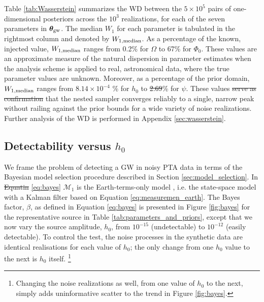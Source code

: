 \documentclass[fleqn,usenatbib,useAMS]{mnras}
\providecommand{\DIFadd}[1]{{\protect\color{blue}\uwave{#1}}} %
\providecommand{\DIFdel}[1]{{\protect\color{red}\sout{#1}}}                      %
\providecommand{\DIFaddbegin}{} %
\providecommand{\DIFaddend}{} %
\providecommand{\DIFdelbegin}{} %
\providecommand{\DIFdelend}{} %
\newcommand{\DIFscaledelfig}{0.5}
\newlength{\DIFdelgraphicswidth} %
\newlength{\DIFdelgraphicsheight} %
\newcommand{\DIFaddincludegraphics}[2][]{{\color{blue}\fbox{\DIFOincludegraphics[#1]{#2}}}} %
\newcommand{\DIFdelincludegraphics}[2][]{%
\sbox{\DIFdelgraphicsbox}{\DIFOincludegraphics[#1]{#2}}%
\settoboxwidth{\DIFdelgraphicswidth}{\DIFdelgraphicsbox} %
\settoboxtotalheight{\DIFdelgraphicsheight}{\DIFdelgraphicsbox} %
\scalebox{\DIFscaledelfig}{%
\parbox[b]{\DIFdelgraphicswidth}{\usebox{\DIFdelgraphicsbox}\\[-\baselineskip] \rule{\DIFdelgraphicswidth}{0em}}\llap{\resizebox{\DIFdelgraphicswidth}{\DIFdelgraphicsheight}{%
\setlength{\unitlength}{\DIFdelgraphicswidth}%
\begin{picture}(1,1)%
\thicklines\linethickness{2pt} %
{\color[rgb]{1,0,0}\put(0,0){\framebox(1,1){}}}%
{\color[rgb]{1,0,0}\put(0,0){\line( 1,1){1}}}%
{\color[rgb]{1,0,0}\put(0,1){\line(1,-1){1}}}%
\end{picture}%
}\hspace*{3pt}}} %
} %
\DeclareRobustCommand{\DIFaddbegin}{\DIFOaddbegin \let\includegraphics\DIFaddincludegraphics} %
\DeclareRobustCommand{\DIFaddend}{\DIFOaddend \let\includegraphics\DIFOincludegraphics} %
\DeclareRobustCommand{\DIFdelbegin}{\DIFOdelbegin \let\includegraphics\DIFdelincludegraphics} %
\DeclareRobustCommand{\DIFdelend}{\DIFOaddend \let\includegraphics\DIFOincludegraphics} %
\begin{document}
Table \ref{tab:Wasserstein} summarizes the WD between the $5\times 10^5$ pairs of one-dimensional posteriors across the $10^3$ realizations, for each of the seven parameters in ${\boldsymbol{\theta}}_{\rm gw}$. The median $W_1$ for each parameter is tabulated in the rightmost column and denoted by $W_{1,{\rm median}}$. As a percentage of the known, injected value, $W_{\rm 1,median}$ ranges from  0.2\% for $\Omega$ to 67\% for $\Phi_0$. These values are an approximate measure of the natural dispersion in parameter estimates when the analysis scheme is applied to real, astronomical data, where the true parameter values are unknown. Moreover, as a percentage of the prior domain, $W_{\rm 1,median}$ ranges from \DIFdelbegin \DIFdel{$8.14 \times 10^{-4}$ }\DIFdelend \DIFaddbegin \DIFadd{$8.1 \times 10^{-4}$ }\DIFaddend \% for $h_0$ to \DIFdelbegin \DIFdel{2.69}\DIFdelend \DIFaddbegin \DIFadd{2.7}\DIFaddend \% for $\psi$. These values \DIFdelbegin \DIFdel{serve as confirmation }\DIFdelend \DIFaddbegin \DIFadd{confirm }\DIFaddend that the nested sampler converges reliably to a single, narrow peak without railing against the prior bounds for a wide variety of noise realizations. Further analysis of the WD is performed in Appendix \ref{sec:wasserstein}.



\subsection{Detectability versus $h_0$} \label{sec:detection}
We frame the problem of detecting a GW in noisy PTA data in terms of the Bayesian model selection procedure described in Section \ref{sec:model_selection}. In \DIFdelbegin \DIFdel{Equatin }\DIFdelend \DIFaddbegin \DIFadd{Equation }\DIFaddend \eqref{eq:bayes} $\mathcal{M}_1$ is the Earth-terms-only model \DIFaddbegin \DIFadd{with a GW present}\DIFaddend , i.e. the state-space model with a Kalman filter based on Equation \eqref{eq:measuremen_earth}. The Bayes factor, $\beta$, as defined in Equation \eqref{eq:bayes} is presented in Figure \ref{fig:bayes} for the representative source in Table \ref{tab:parameters_and_priors}, except that we now vary the source amplitude, $h_0$, from $10^{-15}$ (undetectable) to $10^{-12}$ (easily detectable). To control the test, the noise processes in the synthetic data are identical realisations for each value of $h_0$; the only change from one $h_0$ value to the next is $h_0$ itself. \footnote{Changing the noise realizations as well, from one value of $h_0$ to the next, simply adds uninformative scatter to the trend in Figure \ref{fig:bayes}.} \newline 
\end{document}

